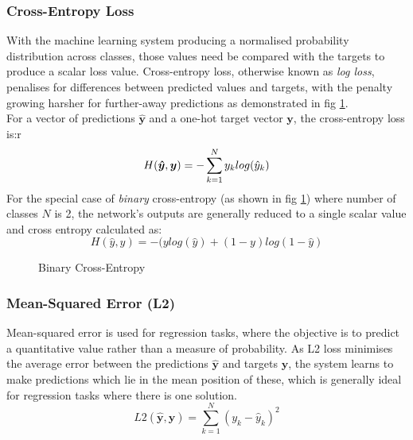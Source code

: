 \documentclass{report}
\begin{document}
	\subsubsection{Cross-Entropy Loss}	
	With the machine learning system producing a normalised probability distribution across classes, those values need be compared with the targets to produce a scalar loss value. 
	Cross-entropy loss, otherwise known as \textit{log loss}, penalises for differences between predicted values and targets, with the penalty growing harsher for further-away predictions as demonstrated in fig \ref{fig:cross-entropy:1}.\\
	For a vector of predictions $\bm{\hat{y}}$ and a one-hot target vector $\bm{y}$, the cross-entropy loss is:r
	\begin{equation} \label{cross-entropy:1}
	 H(\bm{\hat{y}}, \bm{y}) = - \sum_{k=1}^{N}y_k log(\hat{y}_k) \\
	\end{equation}  
	For the special case of \textit{binary} cross-entropy (as shown in fig \ref{fig:cross-entropy:1}) where number of classes $N$ is 2, the network's outputs are generally reduced to a single scalar value and cross entropy calculated as:
	\begin{equation} \label{cross-entropy:2}
	 H(\hat{y}, y) = -(y log(\hat{y}) + (1 - y)log(1-\hat{y})
	\end{equation}
	\begin{figure}[!h]
		\centering
			\caption{Binary Cross-Entropy}
			\label{fig:cross-entropy:1}
	\end{figure}
	
	\subsubsection{Mean-Squared Error (L2)}
	Mean-squared error is used for regression tasks, where the objective is to predict a quantitative value rather than a measure of probability. As L2 loss minimises the average error between the predictions $\bm{\hat{y}}$ and targets $\bm{y}$, the system learns to make predictions which lie in the mean position of these, which is generally ideal for regression tasks where there is one solution.\\
	\begin{equation} \label{mean-squared-error:1}
	 L2(\hat{\bm{y}}, \bm{y}) = \sum_{k=1}^{N}(y_k - \hat{y}_k)^2
	\end{equation}
	
\end{document}
